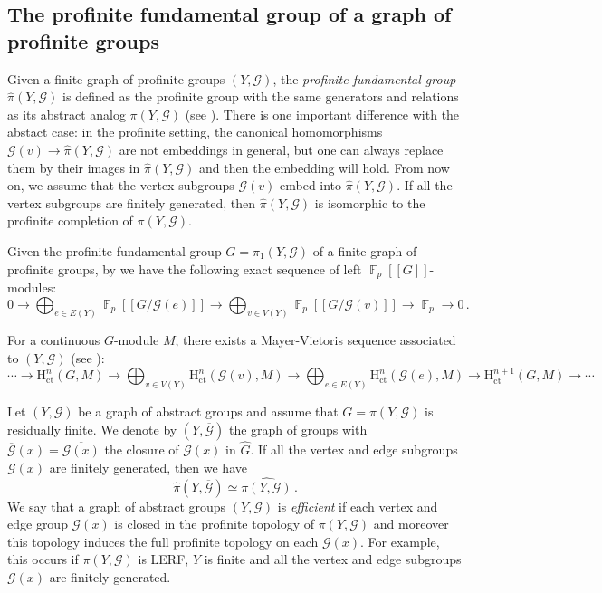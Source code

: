 \documentclass[a4paper]{amsart}
\theoremstyle{definition}
\theoremstyle{remark}
\DeclareMathOperator{\bbf}{\mathbb{F}}
\newcommand{\FFalgebra}[1]{\bbf_p[\![#1]\!]}
\newcommand{\G}{\mathcal G}
\newcommand{\HH}{\mathrm{H}}
\newcommand{\hpi}{\widehat{\pi}}
\begin{document}
\subsection{The profinite fundamental group of a graph  of profinite groups}

Given a finite graph of profinite groups \((Y,\G)\), the \emph{profinite fundamental group} \(\hpi(Y,\G)\) is defined as the profinite group with the same generators and relations as its abstract analog \(\pi(Y,\G)\) (see \cite[Sec. 6.2]{ribesProfiniteGraphsGroups2017}). There is one important difference with the abstact case: in the profinite setting, the canonical homomorphisms \(\G(v) \to \hpi(Y,\G)\) are not embeddings in general, but one can always replace them by their images in \(\hpi(Y,\G)\) and then the embedding will hold. From now on, we assume that the vertex subgroups \(\G(v)\) embed into \(\hpi(Y,\G)\). If all the vertex subgroups are finitely generated, then \(\hpi(Y,\G)\) is isomorphic to the profinite completion of \(\pi(Y,\G)\).

Given the profinite fundamental group \(G = \pi_1(Y,\G)\) of a finite graph of profinite groups, by \cite[Thm. 6.5.2]{ribesProfiniteGraphsGroups2017} we have the following exact sequence of left \(\FFalgebra{G}\)-modules:
\begin{equation}\label{exactseq} 0 \to \bigoplus_{e \in E(Y)} \FFalgebra{G/ \G(e)} \to \bigoplus_{v \in V(Y)} \FFalgebra{G/ \G(v)} \to \bbf_p \to 0\,.
\end{equation}

For a continuous \(G\)-module \(M\), there exists a Mayer-Vietoris sequence associated to \((Y,\G)\) (see \cite[Thm. 8.4.7]{Wilkes}):
\begin{equation}\label{Mayer-Vietoris}
\cdots \to \HH^n_{\mathrm{ct}}(G,M) \to \bigoplus_{v \in V(Y)} \HH^n_{\mathrm{ct}}(\G(v),M) \to \bigoplus_{e \in E(Y)} \HH^n_{\mathrm{ct}}(\G(e),M) \to \HH^{n+1}_{\mathrm{ct}}(G,M) \to \cdots
\end{equation}

Let \((Y,\G)\) be a graph of abstract groups and assume that \(G = \pi(Y,\G)\) is residually finite. We denote by \((Y,\overline{\G})\) the graph of groups with \(\overline{\G}(x) = \overline{\G(x)}\) the closure of \(\G(x)\) in \(\widehat{G}\). If all the vertex and edge subgroups \(\G(x)\) are finitely generated, then we have \[\hpi(Y,\overline{\G}) \simeq \widehat{\pi(Y,\G)}\,.\]
We say that a graph of abstract groups \((Y,\G)\) is \emph{efficient} if each vertex and edge group \(\G(x)\) is closed in the profinite topology of \(\pi(Y,\G)\) and moreover this topology induces the full profinite topology on each \(\G(x)\). For example, this occurs if \(\pi(Y,\G)\) is LERF, \(Y\) is finite and all the vertex and edge subgroups \(\G(x)\) are finitely generated.
\end{document}
